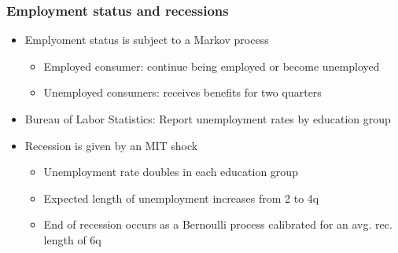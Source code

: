 \documentclass[pdflatex,aspectratio=169]{beamer}
\begin{document}
\begin{frame}
	\frametitle{ Employment status and recessions}
	\begin{itemize}
		\itemsep = \bigskipamount 
		\item Emplyoment status is subject to a Markov process
		\begin{itemize}
			\itemsep = .5\bigskipamount
			\item Employed consumer: continue being employed or become unemployed 
			\item Unemployed consumers: receives benefits for two quarters
		\end{itemize}
		
		\item Bureau of Labor Statistics: Report unemployment rates by education group 
		
		\item Recession is given by an MIT shock
		\begin{itemize}
			\itemsep = .5\bigskipamount
			\item Unemployment rate doubles in each education group
			\item Expected length of unemployment increases from 2 to 4q
			\item End of recession occurs as a Bernoulli process calibrated for an avg. rec. length of 6q
		\end{itemize}
	\end{itemize}
\end{frame}
\end{document}
